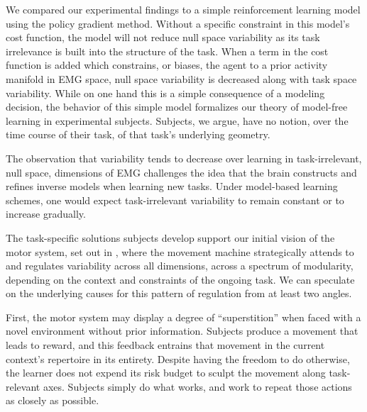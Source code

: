 \documentclass[../main.tex]{subfiles}
\begin{document}
 

We compared our experimental findings to a simple reinforcement learning model using the policy gradient method. Without a specific constraint in this model's cost function, the model will not reduce null space variability as its task irrelevance is built into the structure of the task. When a term in the cost function is added which constrains, or biases, the agent to a prior activity manifold in EMG space, null space variability is decreased along with task space variability. While on one hand this is a simple consequence of a modeling decision, the behavior of this simple model formalizes our theory of model-free learning in experimental subjects. Subjects, we argue, have no notion, over the time course of their task, of that task's underlying geometry. 













The observation that variability tends to decrease over learning in task-irrelevant, null space, dimensions of EMG challenges the idea that the brain constructs and refines inverse models when learning new tasks. Under model-based learning schemes, one would expect task-irrelevant variability to remain constant or to increase gradually.

The task-specific solutions subjects develop support our initial vision of the motor system, set out in , where the movement machine strategically attends to and regulates variability across all dimensions, across a spectrum of modularity, depending on the context and constraints of the ongoing task. We can speculate on the underlying causes for this pattern of regulation from at least two angles.

First, the motor system may display a degree of ``superstition'' when faced with a novel environment without prior information. Subjects produce a movement that leads to reward, and this feedback entrains that movement in the current context's repertoire in its entirety. Despite having the freedom to do otherwise, the learner does not expend its risk budget to sculpt the movement along task-relevant axes. Subjects simply do what works, and work to repeat those actions as closely as possible.
\end{document}
